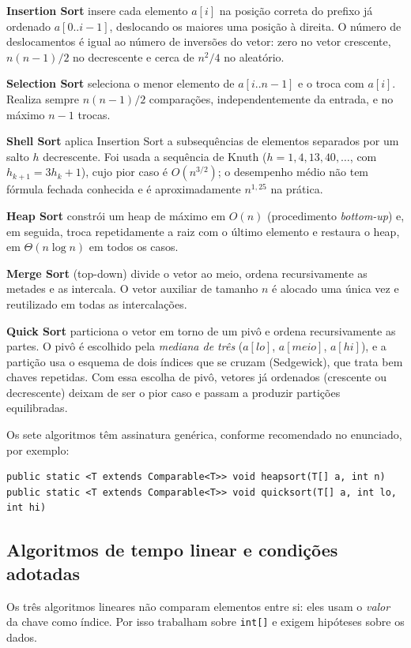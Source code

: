 \documentclass[11pt,a4paper]{article}
\begin{document}
\textbf{Insertion Sort} insere cada elemento $a[i]$ na posição correta do prefixo já ordenado
$a[0..i-1]$, deslocando os maiores uma posição à direita. O número de deslocamentos é igual ao
número de inversões do vetor: zero no vetor crescente, $n(n-1)/2$ no decrescente e cerca de
$n^2/4$ no aleatório.

\textbf{Selection Sort} seleciona o menor elemento de $a[i..n-1]$ e o troca com $a[i]$. Realiza
sempre $n(n-1)/2$ comparações, independentemente da entrada, e no máximo $n-1$ trocas.

\textbf{Shell Sort} aplica Insertion Sort a subsequências de elementos separados por um salto $h$
decrescente. Foi usada a sequência de Knuth ($h = 1, 4, 13, 40, \dots$, com $h_{k+1} = 3h_k+1$),
cujo pior caso é $O(n^{3/2})$; o desempenho médio não tem fórmula fechada conhecida e é
aproximadamente $n^{1{,}25}$ na prática.

\textbf{Heap Sort} constrói um heap de máximo em $O(n)$ (procedimento \emph{bottom-up}) e, em
seguida, troca repetidamente a raiz com o último elemento e restaura o heap, em $\Theta(n \log n)$
em todos os casos.

\textbf{Merge Sort} (top-down) divide o vetor ao meio, ordena recursivamente as metades e as
intercala. O vetor auxiliar de tamanho $n$ é alocado uma única vez e reutilizado em todas as
intercalações.

\textbf{Quick Sort} particiona o vetor em torno de um pivô e ordena recursivamente as partes. O pivô
é escolhido pela \emph{mediana de três} ($a[lo]$, $a[meio]$, $a[hi]$), e a partição usa o esquema
de dois índices que se cruzam (Sedgewick), que trata bem chaves repetidas. Com essa escolha de
pivô, vetores já ordenados (crescente ou decrescente) deixam de ser o pior caso e passam a produzir
partições equilibradas.

Os sete algoritmos têm assinatura genérica, conforme recomendado no enunciado, por exemplo:
\begin{lstlisting}
public static <T extends Comparable<T>> void heapsort(T[] a, int n)
public static <T extends Comparable<T>> void quicksort(T[] a, int lo, int hi)
\end{lstlisting}

\subsection{Algoritmos de tempo linear e condições adotadas}\label{sec:lineares}

Os três algoritmos lineares não comparam elementos entre si: eles usam o \emph{valor} da chave como
índice. Por isso trabalham sobre \texttt{int[]} e exigem hipóteses sobre os dados.
\end{document}
